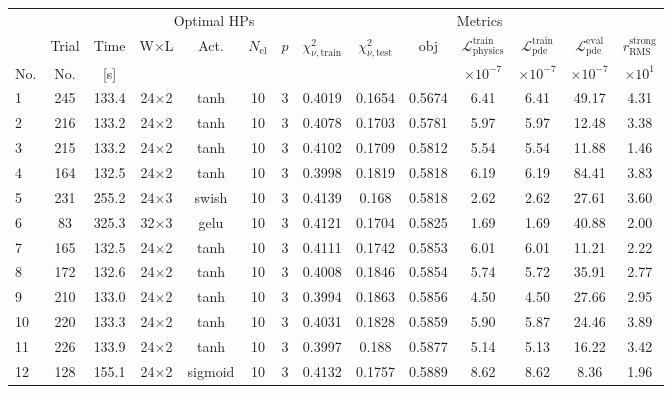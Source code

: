 \begin{tabular}{lcc cccc ccccccc}
\toprule
& & & \multicolumn{4}{c}{Optimal HPs} & \multicolumn{7}{c}{Metrics} \\
\cmidrule(lr){4-7}\cmidrule(lr){8-14}
& Trial & Time & W$\times$L & Act. & $N_{\mathrm{el}}$ & $p$ & $\chi^2_{\nu,\mathrm{train}}$ & $\chi^2_{\nu,\mathrm{test}}$ & $\mathrm{obj}$ & $\mathcal{L}_{\mathrm{physics}}^{\mathrm{train}}$ & $\mathcal{L}_{\mathrm{pde}}^{\mathrm{train}}$ & $\mathcal{L}_{\mathrm{pde}}^{\mathrm{eval}}$ & $r_{\mathrm{RMS}}^{\mathrm{strong}}$ \\
No. & No. & [s] &  &  &  &  &  &  &  & $\times 10^{-7}$ & $\times 10^{-7}$ & $\times 10^{-7}$ & $\times 10^{1}$ \\
\midrule
  1 & 245 & 133.4 & 24$\times$2 & tanh & 10 & 3 & \num{0.4019} & \num{0.1654} & \num{0.5674} & 6.41 & 6.41 & 49.17 & 4.31 \\
  2 & 216 & 133.2 & 24$\times$2 & tanh & 10 & 3 & \num{0.4078} & \num{0.1703} & \num{0.5781} & 5.97 & 5.97 & 12.48 & 3.38 \\
  3 & 215 & 133.2 & 24$\times$2 & tanh & 10 & 3 & \num{0.4102} & \num{0.1709} & \num{0.5812} & 5.54 & 5.54 & 11.88 & 1.46 \\
  4 & 164 & 132.5 & 24$\times$2 & tanh & 10 & 3 & \num{0.3998} & \num{0.1819} & \num{0.5818} & 6.19 & 6.19 & 84.41 & 3.83 \\
  5 & 231 & 255.2 & 24$\times$3 & swish & 10 & 3 & \num{0.4139} & \num{0.168} & \num{0.5818} & 2.62 & 2.62 & 27.61 & 3.60 \\
  6 & 83 & 325.3 & 32$\times$3 & gelu & 10 & 3 & \num{0.4121} & \num{0.1704} & \num{0.5825} & 1.69 & 1.69 & 40.88 & 2.00 \\
  7 & 165 & 132.5 & 24$\times$2 & tanh & 10 & 3 & \num{0.4111} & \num{0.1742} & \num{0.5853} & 6.01 & 6.01 & 11.21 & 2.22 \\
  8 & 172 & 132.6 & 24$\times$2 & tanh & 10 & 3 & \num{0.4008} & \num{0.1846} & \num{0.5854} & 5.74 & 5.72 & 35.91 & 2.77 \\
  9 & 210 & 133.0 & 24$\times$2 & tanh & 10 & 3 & \num{0.3994} & \num{0.1863} & \num{0.5856} & 4.50 & 4.50 & 27.66 & 2.95 \\
  10 & 220 & 133.3 & 24$\times$2 & tanh & 10 & 3 & \num{0.4031} & \num{0.1828} & \num{0.5859} & 5.90 & 5.87 & 24.46 & 3.89 \\
  11 & 226 & 133.9 & 24$\times$2 & tanh & 10 & 3 & \num{0.3997} & \num{0.188} & \num{0.5877} & 5.14 & 5.13 & 16.22 & 3.42 \\
  12 & 128 & 155.1 & 24$\times$2 & sigmoid & 10 & 3 & \num{0.4132} & \num{0.1757} & \num{0.5889} & 8.62 & 8.62 & 8.36 & 1.96 \\

\end{tabular}
